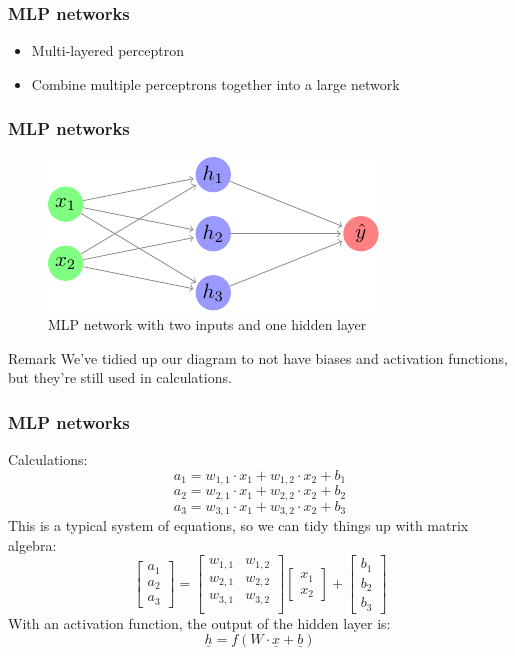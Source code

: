 \documentclass{beamer}
\begin{document}
\begin{frame}
    \frametitle{MLP networks}
    \begin{itemize}
        \item Multi-layered perceptron
        \item Combine multiple perceptrons together into a large network
    \end{itemize}
\end{frame}

\begin{frame}
    \frametitle{MLP networks}
    \begin{figure}
        \includegraphics{figures/basic-mlp/main.pdf}
        \caption{MLP network with two inputs and one hidden layer}
    \end{figure}
    \begin{block}{Remark}
        We've tidied up our diagram to not have biases and activation functions, but they're still used in calculations.
    \end{block}
\end{frame}

\begin{frame}
    \frametitle{MLP networks}
    Calculations:
    \[a_{1} = w_{1, 1} \cdot x_1 + w_{1, 2} \cdot x_2 + b_{1}\]
    \[a_{2} = w_{2, 1} \cdot x_1 + w_{2, 2} \cdot x_2 + b_{2}\]
    \[a_{3} = w_{3, 1} \cdot x_1 + w_{3, 2} \cdot x_2 + b_{3}\] \pause
    This is a typical system of equations, so we can tidy things up with matrix algebra: \pause
    \[
        \begin{bmatrix}
            a_{1} \\
            a_{2} \\
            a_{3}
        \end{bmatrix}
        =
        \begin{bmatrix}
            w_{1, 1} & w_{1, 2} \\
            w_{2, 1} & w_{2, 2} \\
            w_{3, 1} & w_{3, 2} \\
        \end{bmatrix}
        \begin{bmatrix}
            x_1 \\
            x_2
        \end{bmatrix}
        +
        \begin{bmatrix}
            b_1 \\
            b_2 \\
            b_3
        \end{bmatrix}
    \] \pause
    With an activation function, the output of the hidden layer is:
    \[\underline{h} = f(W \cdot \underline{x} + \underline{b})\]
\end{frame}
\end{document}
